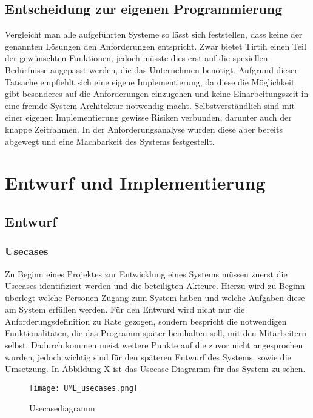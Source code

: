 \section{Entscheidung zur eigenen Programmierung}
\label{sec:decisionowncreating}

Vergleicht man alle aufgeführten Systeme so lässt sich feststellen, dass keine der genannten Lösungen den Anforderungen entspricht.
Zwar bietet Tirtih einen Teil der gewünschten Funktionen, jedoch müsste dies erst auf die speziellen Bedürfnisse angepasst werden, die das Unternehmen benötigt.
Aufgrund dieser Tatsache empfiehlt sich eine eigene Implementierung, da diese die Möglichkeit gibt besonderes auf die Anforderungen einzugehen und keine Einarbeitungszeit in eine fremde System-Architektur notwendig macht.
Selbstverständlich sind mit einer eigenen Implementierung gewisse Risiken verbunden, darunter auch der knappe Zeitrahmen.
In der Anforderungsanalyse wurden diese aber bereits abgewegt und eine Machbarkeit des Systems festgestellt.

\chapter{Entwurf und Implementierung}
\label{cha:entw_imp}

\section{Entwurf}
\label{sec:Entwurf}


\subsection{Usecases}
\label{subsec:usecases}

Zu Beginn eines Projektes zur Entwicklung eines Systems müssen zuerst die Usecases identifiziert werden und die beteiligten Akteure.
Hierzu wird zu Beginn überlegt welche Personen Zugang zum System haben und welche Aufgaben diese am System erfüllen werden.
Für den Entwurd wird nicht nur die Anforderungsdefinition zu Rate gezogen, sondern bespricht die notwendigen Funktionalitäten, die das Programm später beinhalten soll, mit den Mitarbeitern selbst.
Dadurch kommen meist weitere Punkte auf die zuvor nicht angesprochen wurden, jedoch wichtig sind für den späteren Entwurf des Systems, sowie die Umsetzung.
In Abbildung X ist das Usecase-Diagramm für das System zu sehen.

\begin{figure}[H]
\centering
\texttt{[image: UML\_usecases.png]}
\caption{Usecasediagramm}
\label{fig:usecase001}
\end{figure}


